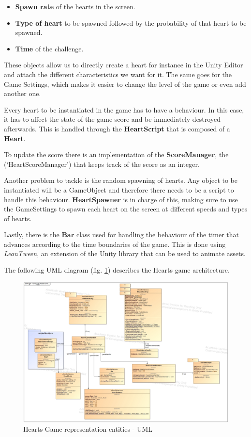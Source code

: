 \begin{itemize}[noitemsep, topsep=5pt, parsep=5pt, partopsep=5pt]
    \item \textbf{Spawn rate} of the hearts in the screen.
    \item \textbf{Type of heart} to be spawned followed by the probability of that heart to be spawned.
    \item \textbf{Time} of the challenge.
\end{itemize}

These objects allow us to directly create a heart for instance in the Unity Editor and attach the different characteristics we want for it. The same goes for the Game Settings, which makes it easier to change the level of the game or even add another one.

Every heart to be instantiated in the game has to have a behaviour. In this case, it has to affect the state of the game score and be immediately destroyed afterwards. This is handled through the \textbf{HeartScript} that is composed of a \textbf{Heart}.

To update the score there is an implementation of the \textbf{ScoreManager}, the (`HeartScoreManager') that keeps track of the score as an integer.

Another problem to tackle is the random spawning of hearts. Any object to be instantiated will be a GameObject and therefore there needs to be a script to handle this behaviour. \textbf{HeartSpawner} is in charge of this, making sure to use the GameSettings to spawn each heart on the screen at different speeds and types of hearts.

Lastly, there is the \textbf{Bar} class used for handling the behaviour of the timer that advances according to the time boundaries of the game. This is done using \textit{LeanTween}, an extension of the Unity library that can be used to animate assets.

The following UML diagram (fig. \ref{fig:heartsGameArq}) describes the Hearts game architecture.

\begin{figure}[H]
    \centering
    \includegraphics[width=\linewidth]{Chapters/new_architechture/class__hearts__HeartsGame.jpg}
    \caption{Hearts Game representation entities - UML}
    \label{fig:heartsGameArq}
\end{figure}

